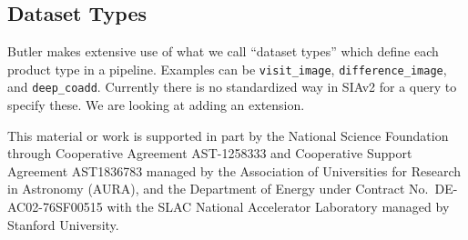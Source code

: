 \documentclass[11pt,twoside]{article}
\begin{document}
\subsection{Dataset Types}

Butler makes extensive use of what we call ``dataset types'' which define each product type in a pipeline. Examples can be \texttt{visit\_image}, \texttt{difference\_image}, and \texttt{deep\_coadd}.
Currently there is no standardized way in SIAv2 for a query to specify these.
We are looking at adding an extension.


\acknowledgments This material or work is supported in part by the National Science Foundation through Cooperative Agreement AST-1258333 and Cooperative Support Agreement AST1836783 managed by the Association of Universities for Research in Astronomy (AURA), and the Department of Energy under Contract No.\ DE-AC02-76SF00515 with the SLAC National Accelerator Laboratory managed by Stanford University.


\end{document}
